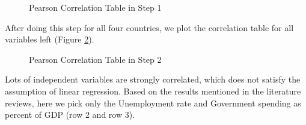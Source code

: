 \documentclass[11pt]{article}
\begin{document}
\begin{figure}[H]
\begin{center}
    \caption{Pearson Correlation Table in Step 1}
    \label{fig:pearson1}
\end{center}
\end{figure}
After doing this step for all four countries, we plot the correlation table for all variables left (Figure \ref{fig:pearson2}).
\begin{figure}[H]
\begin{center}
    \caption{Pearson Correlation Table in Step 2}
    \label{fig:pearson2}
\end{center}
\end{figure}

Lots of independent variables are strongly correlated, which does not satisfy the assumption of linear regression. Based on the results mentioned in the literature reviews, here we pick only the Unemployment rate and Government spending as percent of GDP (row 2 and row 3).
\end{document}

